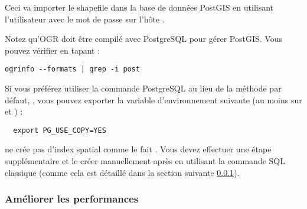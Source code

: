 Ceci va importer le shapefile  dans la base de donn\'ees PostGIS  en utilisant l'utilisateur  avec le mot de passe  sur l'h\^ote .

Notez qu'OGR doit \^etre compil\'e avec PostgreSQL pour g\'erer PostGIS. Vous pouvez v\'erifier en tapant :
\begin{verbatim}
ogrinfo --formats | grep -i post
\end{verbatim}

Si vous pr\'ef\'erez utiliser la commande PostgreSQL  au lieu de la m\'ethode par d\'efaut, , vous pouvez exporter la variable d'environnement suivante (au moins sur \nix et \osx) :
\begin{verbatim}
  export PG_USE_COPY=YES
\end{verbatim}

 ne cr\'ee pas d'index spatial comme le fait . Vous devez effectuer une \'etape suppl\'ementaire et le cr\'eer manuellement apr\`es en utilisant la commande SQL classique  (comme cela est d\'etaill\'e dans la section suivante \ref{label_improve}).

\subsubsection{Am\'eliorer les performances} \label{label_improve}

